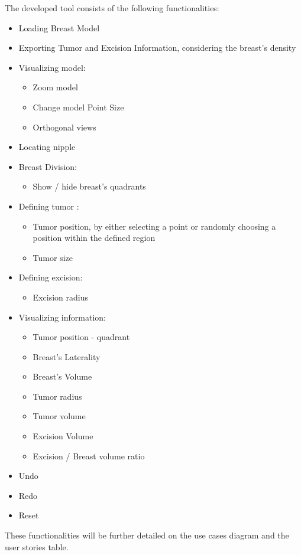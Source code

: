 The developed tool consists of the following functionalities:

\begin{itemize}
\item Loading Breast Model
\item Exporting Tumor and Excision Information, considering the breast's density
\item Visualizing model:
\begin{itemize}
\item Zoom model
\item Change model Point Size
\item Orthogonal views
\end{itemize}
\item Locating nipple
\item Breast Division:
\begin{itemize}
\item Show / hide breast's quadrants
\end{itemize}
\item Defining tumor :
\begin{itemize}
\item Tumor position, by either selecting a point or randomly choosing a position within the defined region  
\item Tumor size
\end{itemize}
\item Defining excision:
\begin{itemize}
\item Excision radius
\end{itemize}
\item Visualizing information:
\begin{itemize}
\item Tumor position - quadrant
\item Breast's Laterality
\item Breast's Volume
\item Tumor radius
\item Tumor volume
\item Excision Volume
\item Excision / Breast volume ratio
\end{itemize}
\item Undo
\item Redo
\item Reset
\end{itemize}

These functionalities will be further detailed on the use cases diagram and the user stories table.



